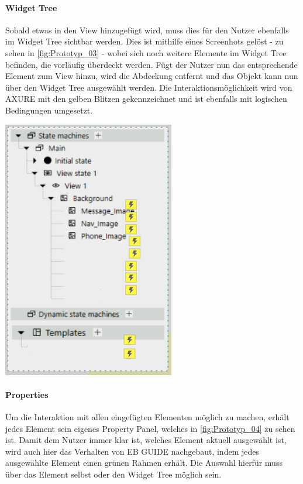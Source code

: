 \paragraph{Widget Tree}
Sobald etwas in den View hinzugefügt wird, muss dies für den Nutzer ebenfalls im Widget Tree sichtbar werden.
Dies ist mithilfe eines Screenhots gelöst - zu sehen in \cref{fig:Prototyp_03} -  wobei sich noch weitere Elemente im Widget Tree befinden, die vorläufig überdeckt werden.
Fügt der Nutzer nun das entsprechende Element zum View hinzu, wird die Abdeckung entfernt und das Objekt kann nun über den Widget Tree ausgewählt werden.
Die Interaktionsmöglichkeit wird von AXURE mit den gelben Blitzen gekennzeichnet und ist ebenfalls mit logischen Bedingungen umgesetzt.

\begin{center}
  \includegraphics[scale=0.8]{figures/Prototyp_03.PNG}
  \label{fig:Prototyp_03}
\end{center}

\paragraph{Properties}
Um die Interaktion mit allen eingefügten Elementen möglich zu machen, erhält jedes Element sein eigenes Property Panel, welches in \cref{fig:Prototyp_04} zu sehen ist.
Damit dem Nutzer immer klar ist, welches Element aktuell ausgewählt ist, wird auch hier das Verhalten von EB GUIDE nachgebaut, indem jedes ausgewählte Element einen grünen Rahmen erhält.
Die Auswahl hierfür muss über das Element selbst oder den Widget Tree möglich sein.

